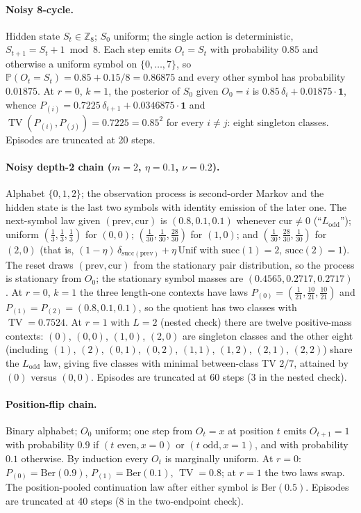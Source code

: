 \documentclass{article}
\newcommand{\Prb}{\mathbb P}
\DeclareMathOperator{\TV}{TV}
\begin{document}
\paragraph{Noisy 8-cycle.}
Hidden state $S_t\in\mathbb Z_8$; $S_0$ uniform; the single action is
deterministic, $S_{t+1}=S_t+1\bmod 8$.  Each step emits
$O_t=S_t$ with probability $0.85$ and otherwise a uniform symbol on
$\{0,\ldots,7\}$, so $\Prb(O_t=S_t)=0.85+0.15/8=0.86875$ and every other
symbol has probability $0.01875$.  At $r=0$, $k=1$, the posterior of $S_0$ given
$O_0=i$ is $0.85\,\delta_i+0.01875\cdot\mathbf 1$, whence
$P_{(i)}=0.7225\,\delta_{i+1}+0.0346875\cdot\mathbf 1$ and
$\TV(P_{(i)},P_{(j)})=0.7225=0.85^2$ for every $i\neq j$: eight singleton
classes.  Episodes are truncated at 20 steps.

\paragraph{Noisy depth-2 chain ($m=2$, $\eta=0.1$, $\nu=0.2$).}
Alphabet $\{0,1,2\}$; the observation process is second-order Markov and the
hidden state is the last two symbols with identity emission of the later one.
The next-symbol law given $(\text{prev},\text{cur})$ is
$(0.8,0.1,0.1)$ whenever $\text{cur}\ne0$ (``$L_{\text{odd}}$'');
uniform $(\tfrac13,\tfrac13,\tfrac13)$ for $(0,0)$;
$(\tfrac1{30},\tfrac1{30},\tfrac{28}{30})$ for $(1,0)$; and
$(\tfrac1{30},\tfrac{28}{30},\tfrac1{30})$ for $(2,0)$ (that is,
$(1-\eta)\,\delta_{\text{succ}(\text{prev})}+\eta\,\mathrm{Unif}$ with
$\text{succ}(1)=2$, $\text{succ}(2)=1$).  The reset draws
$(\text{prev},\text{cur})$ from the stationary pair distribution, so the
process is stationary from $O_0$; the stationary symbol masses are
$(0.4565,0.2717,0.2717)$.  At $r=0$, $k=1$ the three length-one contexts have
laws $P_{(0)}=(\tfrac1{21},\tfrac{10}{21},\tfrac{10}{21})$ and
$P_{(1)}=P_{(2)}=(0.8,0.1,0.1)$, so the quotient has two classes with
$\TV=0.7524$.  At $r=1$ with $L=2$ (nested check) there are twelve
positive-mass contexts: $(0)$, $(0,0)$, $(1,0)$, $(2,0)$ are singleton
classes and the other eight (including $(1)$, $(2)$, $(0,1)$, $(0,2)$,
$(1,1)$, $(1,2)$, $(2,1)$, $(2,2)$) share the $L_{\text{odd}}$ law, giving
five classes with minimal between-class TV $2/7$, attained by $(0)$ versus
$(0,0)$.  Episodes are truncated at 60 steps (3 in the nested check).

\paragraph{Position-flip chain.}
Binary alphabet; $O_0$ uniform; one step from $O_t=x$ at position $t$ emits
$O_{t+1}=1$ with probability $0.9$ if $(t\text{ even},x=0)$ or
$(t\text{ odd},x=1)$, and with probability $0.1$ otherwise.  By induction
every $O_t$ is marginally uniform.  At $r=0$: $P_{(0)}=\mathrm{Ber}(0.9)$,
$P_{(1)}=\mathrm{Ber}(0.1)$, $\TV=0.8$; at $r=1$ the two laws swap.  The
position-pooled continuation law after either symbol is $\mathrm{Ber}(0.5)$.
Episodes are truncated at 40 steps (8 in the two-endpoint check).
\end{document}

